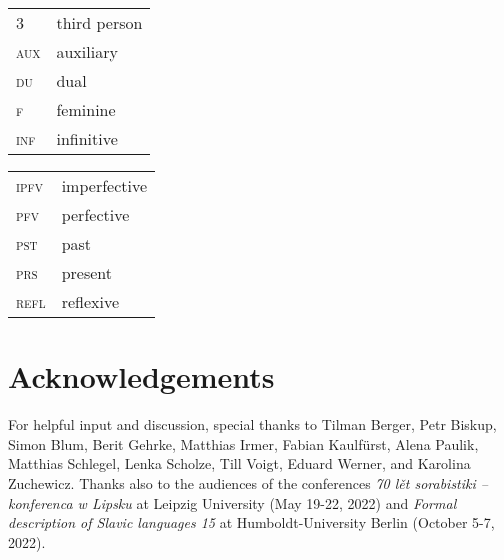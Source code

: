 \documentclass[output=paper,colorlinks,citecolor=brown]{langscibook}
\begin{document}
\begin{tabularx}{.45\textwidth}{@{}lX@{}}
\textsc{3}&third person\\
\textsc{aux}&auxiliary\\
\textsc{du}&dual\\
\textsc{f}&feminine\\
\textsc{inf}&infinitive\\
\end{tabularx}%
\begin{tabularx}{.5\textwidth}{@{}lX@{}}
\textsc{ipfv}&imperfective\\
\textsc{pfv}&perfective\\
\textsc{pst}&past\\
\textsc{prs}&present\\
\textsc{refl}&reflexive\\

\end{tabularx}

\section*{Acknowledgements}
For helpful input and discussion, special thanks to Tilman Berger, Petr Biskup, Simon Blum, Berit Gehrke, Matthias Irmer, Fabian Kaulfürst, Alena Paulik,  Matthias Schlegel, Lenka Scholze, Till Voigt, Eduard Werner, and Karolina Zuchewicz.
Thanks also to the audiences of the conferences 
\textit{70 lět sorabistiki -- konferenca w Lipsku} at Leipzig University (May 19-22, 2022)
and
\textit{Formal description of Slavic languages 15} at Humboldt-University Berlin (October 5-7, 2022).
\sloppy
\printbibliography[heading=subbibliography,notkeyword=this]
\end{document}
